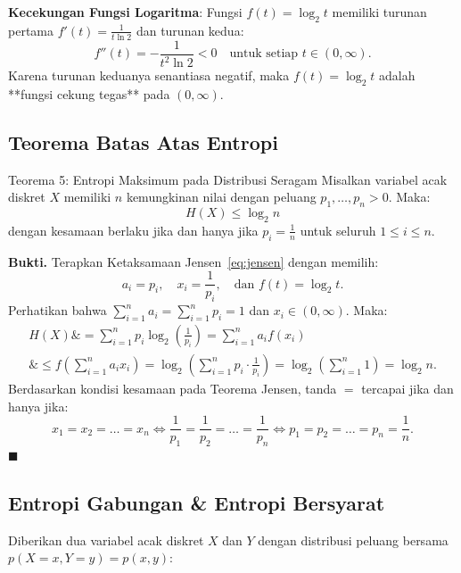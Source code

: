 \documentclass[11pt,a4paper]{article}
\newenvironment{proof}{\noindent\textbf{Bukti.}}{\hfill$\blacksquare$\vspace{0.3em}}
\begin{document}
\noindent\textbf{Kecekungan Fungsi Logaritma}:
Fungsi $f(t) = \log_2 t$ memiliki turunan pertama $f'(t) = \frac{1}{t \ln 2}$ dan turunan kedua:
\begin{equation}
f''(t) = -\frac{1}{t^2 \ln 2} < 0 \quad \text{untuk setiap } t \in (0, \infty).
\end{equation}
Karena turunan keduanya senantiasa negatif, maka $f(t) = \log_2 t$ adalah **fungsi cekung tegas** pada $(0, \infty)$.

\subsection{Teorema Batas Atas Entropi}

\begin{thmbox}{Teorema 5: Entropi Maksimum pada Distribusi Seragam}
Misalkan variabel acak diskret $X$ memiliki $n$ kemungkinan nilai dengan peluang $p_1, \dots, p_n > 0$. Maka:
\begin{equation}
\label{eq:max_entropy}
H(X) \le \log_2 n
\end{equation}
dengan kesamaan berlaku jika dan hanya jika $p_i = \frac{1}{n}$ untuk seluruh $1 \le i \le n$.
\end{thmbox}
\begin{proof}
Terapkan Ketaksamaan Jensen~\eqref{eq:jensen} dengan memilih:
\[
a_i = p_i, \quad x_i = \frac{1}{p_i}, \quad \text{dan } f(t) = \log_2 t.
\]
Perhatikan bahwa $\sum_{i=1}^n a_i = \sum_{i=1}^n p_i = 1$ dan $x_i \in (0, \infty)$. Maka:
\begin{align*}
H(X) \&= \sum_{i=1}^n p_i \log_2\left(\frac{1}{p_i}\right) = \sum_{i=1}^n a_i f(x_i) \\
\&\le f\left(\sum_{i=1}^n a_i x_i\right) = \log_2\left(\sum_{i=1}^n p_i \cdot \frac{1}{p_i}\right) = \log_2\left(\sum_{i=1}^n 1\right) = \log_2 n.
\end{align*}
Berdasarkan kondisi kesamaan pada Teorema Jensen, tanda $=$ tercapai jika dan hanya jika:
\[
x_1 = x_2 = \dots = x_n \iff \frac{1}{p_1} = \frac{1}{p_2} = \dots = \frac{1}{p_n} \iff p_1 = p_2 = \dots = p_n = \frac{1}{n}. 
\]
\end{proof}

\subsection{Entropi Gabungan \& Entropi Bersyarat}
Diberikan dua variabel acak diskret $X$ dan $Y$ dengan distribusi peluang bersama $p(X=x, Y=y) = p(x,y)$:
\end{document}

